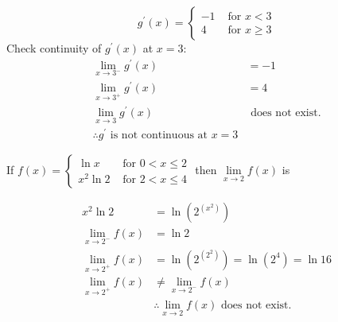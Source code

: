 \documentclass[12pt,letterpaper, onecolumn]{exam}
\begin{document}
\begin{questions}
\begin{solution}
	$$ g^\prime(x) =
	\begin{cases}
	-1 & \text{ for } x < 3 \\
	 4 & \text{ for } x \geq 3
	\end{cases}	
	$$
	Check continuity of $g^\prime(x)$ at $x=3$:
	\begin{align*}
		\lim_{x\to3^-} g^\prime(x)  &=  -1 \\ %
		\lim_{x\to3^+} g^\prime(x) &= 4 \\ %
		\lim_{x\to3} g^\prime(x)      & \text{ does not exist.} \\ %
		\boxed{\therefore g^\prime \text{ is not continuous at } x=3}
	\end{align*}

    \end{solution}
    

\question 
    If $ f(x) = 
\begin{cases}
	\ln x 		& \text{ for } 	    0 < x \leq 2 \\ 
	x^2 \ln 2 	& \text { for } 	2 < x \leq 4
\end{cases}
$ then $ \lim\limits_{x\to2} f(x) $ is


    
    \begin{solution}
	
            \begin{align*}
		x^2 \ln 2		 &= \ln ( 2 ^  {(x ^ 2)} ) \\
		\lim_{x\to2^-} f(x)  &=  \ln 2 \\ %
		\lim_{x\to2^+} f(x) &= \ln (2^{(2^2)}) = \ln (2^4) = \ln 16 \\ %
		\lim_{x\to2^+} f(x) & \neq \lim_{x\to2^-} f(x) \\ %
					 & \therefore \boxed{\lim_{x\to2} f(x) \text{ does not exist.}}
	\end{align*}
    \end{solution}
 

\end{questions}
\end{document}
